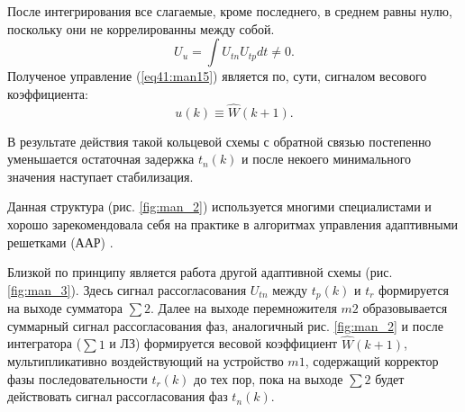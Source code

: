 После интегрирования все слагаемые, кроме последнего, в среднем равны нулю, поскольку они не коррелированны между собой.
\begin{equation}\label{eq41:man15}
U_u=\int U_{tn}U_{tp}dt\neq0.
\end{equation}
Полученое управление (\ref{eq41:man15}) является по, сути, сигналом весового коэффициента:
\begin{equation}\label{eq41:man16}
u(k)\equiv \hat W(k+1).
\end{equation}

В результате действия такой кольцевой схемы с обратной связью постепенно уменьшается остаточная задержка $t_n(k)$ и после некоего минимального значения наступает стабилизация.

Данная структура (рис. \ref{fig:man_2}) используется многими специалистами и хорошо зарекомендовала себя на практике в алгоритмах управления адаптивными решетками (ААР) \cite{popovski,monzigo,windrow}.

Близкой по принципу является работа другой адаптивной схемы (рис. \ref{fig:man_3}).
Здесь сигнал рассогласования $U_{tn}$ между $t_p(k)$ и $t_r$ формируется на выходе сумматора $\sum 2$. 
Далее на выходе перемножителя $m2$ образовывается суммарный сигнал рассогласования фаз, аналогичный рис. \ref{fig:man_2} и после интегратора ($\sum1$ и ЛЗ) формируется весовой коэффициент $\hat W(k+1)$, мультипликативно воздействующий на устройство $m1$, содержащий корректор фазы последовательности $t_r(k)$ до тех пор, пока на выходе $\sum2$ будет действовать сигнал рассогласования фаз $t_n(k)$.



